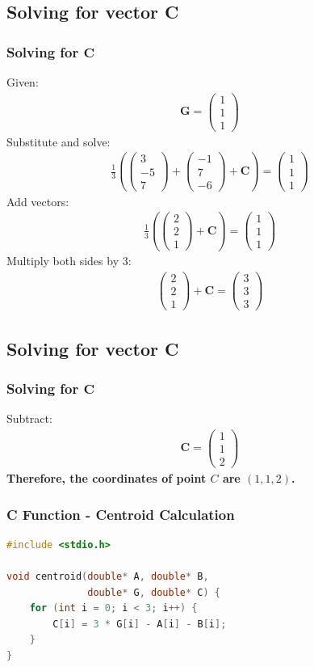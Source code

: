 \documentclass{beamer}
\providecommand{\myvec}[1]{\ensuremath{\begin{pmatrix}#1\end{pmatrix}}}
\let\vec\mathbf
\begin{document}
\subsection{Solving for vector C}
\begin{frame}
\frametitle{Solving for $\vec{C}$}
Given:
\begin{align}
\vec{G} = \myvec{1\\1\\1}
\end{align}
Substitute and solve:
\begin{align}
\frac{1}{3}\left(\myvec{3\\-5\\7} + \myvec{-1\\7\\-6} + \vec{C}\right) = \myvec{1\\1\\1}
\end{align}
Add vectors:
\begin{align}
\frac{1}{3}\left(\myvec{2\\2\\1} + \vec{C}\right) = \myvec{1\\1\\1}
\end{align}
Multiply both sides by 3:
\begin{align}
\myvec{2\\2\\1} + \vec{C} = \myvec{3\\3\\3}
\end{align}
\end{frame}

\subsection{Solving for vector C}
\begin{frame}
\frametitle{Solving for $\vec{C}$}





Subtract:
\begin{align}
\vec{C} = \myvec{1\\1\\2}
\end{align}
\textbf{Therefore, the coordinates of point $C$ are $(1,1,2)$.}
\end{frame}


\begin{frame}[fragile]
\frametitle{C Function - Centroid Calculation}

\begin{lstlisting}[language=C]
#include <stdio.h>

void centroid(double* A, double* B,
              double* G, double* C) {
    for (int i = 0; i < 3; i++) {
        C[i] = 3 * G[i] - A[i] - B[i];
    }
}
\end{lstlisting}

\end{frame}
\end{document}
